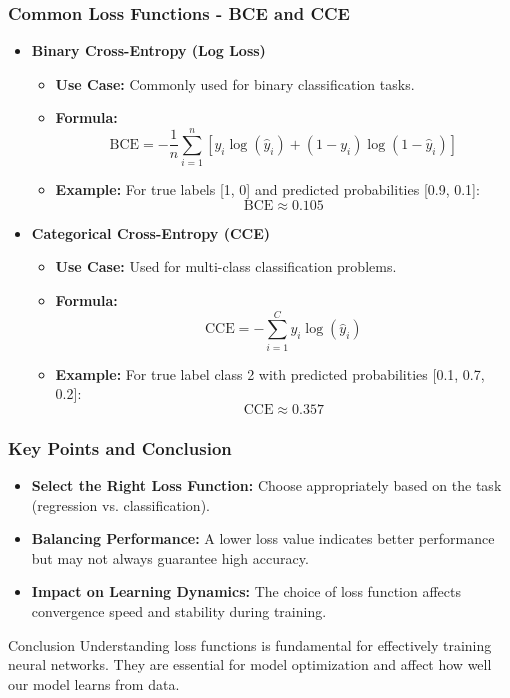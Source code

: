 \documentclass[aspectratio=169]{beamer}
\begin{document}
\begin{frame}[fragile]
  \frametitle{Common Loss Functions - BCE and CCE}
  \begin{itemize}
    \item \textbf{Binary Cross-Entropy (Log Loss)}
    \begin{itemize}
      \item \textbf{Use Case:} Commonly used for binary classification tasks.
      \item \textbf{Formula:}
      \begin{equation}
        \text{BCE} = -\frac{1}{n} \sum_{i=1}^{n} \left[y_i \log(\hat{y}_i) + (1 - y_i) \log(1 - \hat{y}_i)\right]
      \end{equation}
      \item \textbf{Example:} For true labels [1, 0] and predicted probabilities [0.9, 0.1]:
      \begin{equation}
        \text{BCE} \approx 0.105
      \end{equation}
    \end{itemize}
    
    \item \textbf{Categorical Cross-Entropy (CCE)}
    \begin{itemize}
      \item \textbf{Use Case:} Used for multi-class classification problems.
      \item \textbf{Formula:}
      \begin{equation}
        \text{CCE} = -\sum_{i=1}^{C} y_i \log(\hat{y}_i)
      \end{equation}
      \item \textbf{Example:} For true label class 2 with predicted probabilities [0.1, 0.7, 0.2]:
      \begin{equation}
        \text{CCE} \approx 0.357
      \end{equation}
    \end{itemize}
  \end{itemize}
\end{frame}

\begin{frame}[fragile]
  \frametitle{Key Points and Conclusion}
  \begin{itemize}
    \item \textbf{Select the Right Loss Function:} Choose appropriately based on the task (regression vs. classification).
    \item \textbf{Balancing Performance:} A lower loss value indicates better performance but may not always guarantee high accuracy.
    \item \textbf{Impact on Learning Dynamics:} The choice of loss function affects convergence speed and stability during training.
  \end{itemize}

  \begin{block}{Conclusion}
    Understanding loss functions is fundamental for effectively training neural networks. They are essential for model optimization and affect how well our model learns from data.
  \end{block}
\end{frame}
\end{document}
